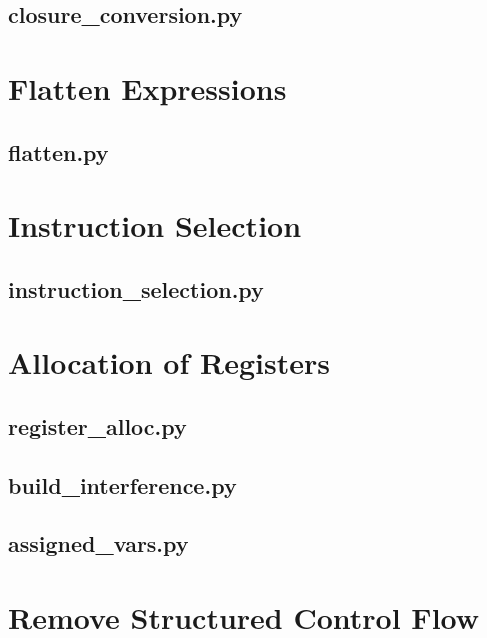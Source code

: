 \documentclass[a4paper,10pt]{article}
\begin{document}
\subsection{closure\_conversion.py}


\clearpage
\section{Flatten Expressions}

\subsection{flatten.py}


\clearpage
\section{Instruction Selection}

\subsection{instruction\_selection.py}


\clearpage
\section{Allocation of Registers}

\subsection{register\_alloc.py}


\subsection{build\_interference.py}


\subsection{assigned\_vars.py}


\clearpage
\section{Remove Structured Control Flow}
\end{document}
